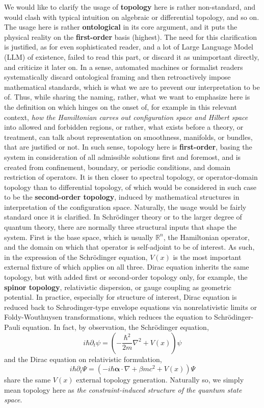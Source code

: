 We would like to clarify the usage of \textbf{topology} here is rather non-standard, and would clash with typical intuition on algebraic or differential topology, and so on. The usage here is rather \textbf{ontological} in its core argument, and it puts the physical reality on the \textbf{first-order} basis (highest). The need for this clarification is justified, as for even sophisticated reader, and a lot of Large Language Model (LLM) of existence, failed to read this part, or discard it as unimportant directly, and criticize it later on. In a sense, automated machines or formalist readers systematically discard ontological framing and then retroactively impose mathematical standards, which is what we are to prevent our interpretation to be of. Thus, while sharing the naming, rather, what we want to emphasize here is the definition on which hinges on the onset of, for example in this relevant context, \textit{how the Hamiltonian carves out configuration space and Hilbert space} into allowed and forbidden regions, or rather, what exists before a theory, or treatment, can talk about representation on smoothness, manifolds, or bundles, that are justified or not. In such sense, topology here is \textbf{first-order}, basing the system in consideration of all admissible solutions first and foremost, and is created from confinement, boundary, or periodic conditions, and domain restriction of operators. It is then closer to spectral topology, or operator-domain topology than to differential topology, of which would be considered in such case to be the \textbf{second-order topology}, induced by mathematical structures in interpretation of the configuration space. Naturally, the usage would be fairly standard once it is clarified. In Schrödinger theory or to the larger degree of quantum theory, there are normally three structural inputs that shape the system. First is the base space, which is usually $\mathbb{R}^{n}$, the Hamiltonian operator, and the domain on which that operator is self-adjoint to be of interest. As such, in the expression of the Schrödinger equation, $V(x)$ is the most important external fixture of which applies on all three. Dirac equation inherits the same topology, but with added first or second-order topology only, for example, the \textbf{spinor topology}, relativistic dispersion, or gauge coupling as geometric potential. In practice, especially for structure of interest, Dirac equation is reduced back to Schrodinger-type envelope equations via nonrelativistic limits or Foldy-Wouthuysen transformations, which reduces the equation to Schrödinger-Pauli equation. In fact, by observation, the Schrödinger equation,
\begin{equation}
    i\hbar \partial_{t}\psi = \left(-\frac{\hbar^2}{2m}\nabla^{2}+V(x)\right)\psi
\end{equation}
and the Dirac equation on relativistic formulation,
\begin{equation}
    i\hbar \partial_t \Psi = (-i\hbar \bm{\alpha}\cdot \nabla + \beta mc^{2}+ V(x))\Psi
\end{equation}
share the same $V(x)$ external topology generation. Naturally so, we simply mean topology here as \textit{the constraint-induced structure of the quantum state space}. 

